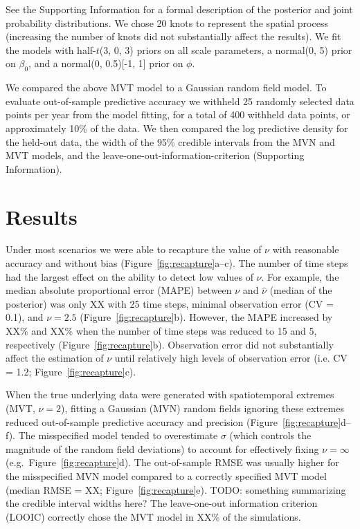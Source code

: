 \documentclass[12pt,english]{article}
\begin{document}
\begin{spacing}{1.9}
See the Supporting Information for a formal description
of the posterior and joint
probability distributions.
We chose 20 knots to represent the spatial process
(increasing the number of knots did not substantially affect the results).
We fit the models with half-$t$(3, 0, 3) priors on all
scale parameters,
a normal(0, 5) prior on $\beta_0$,
and a normal(0, 0.5)[-1, 1] prior on $\phi$.

We compared the above MVT
model to a Gaussian random field model.
To evaluate out-of-sample predictive accuracy we withheld
25 randomly selected data points
per year from the model fitting,
for a total of 400 withheld data points,
or approximately 10\% of the data.
We then compared the log predictive density for the held-out data,
the width of the 95\% credible intervals
from the MVN and MVT models, and
the leave-one-out-information-criterion (Supporting Information).

\section{Results}

Under most scenarios we were able to recapture the value of $\nu$ with
reasonable accuracy and without bias (Figure~\ref{fig:recapture}a--c). The
number of time steps had the largest effect on the ability to detect low values
of $\nu$. For example, the median absolute proportional error (MAPE) between
$\nu$ and $\hat{\nu}$ (median of the posterior) was only XX with 25 time steps,
minimal observation error (CV = 0.1), and $\nu = 2.5$
(Figure~\ref{fig:recapture}b). However, the MAPE increased by XX\% and XX\% when
the number of time steps was reduced to 15 and 5, respectively
(Figure~\ref{fig:recapture}b). Observation error did not substantially affect
the estimation of $\nu$ until relatively high levels of observation error
(i.e. CV = 1.2; Figure~\ref{fig:recapture}c).

When the true underlying data were generated with spatiotemporal extremes (MVT,
$\nu = 2$), fitting a Gaussian (MVN) random fields ignoring these extremes
reduced out-of-sample predictive accuracy and precision
(Figure~\ref{fig:recapture}d--f). The misspecified model tended to overestimate
$\sigma$ (which controls the magnitude of the random field deviations) to
account for effectively fixing $\nu = \infty$ (e.g.\ Figure~\ref{fig:recapture}d). The
out-of-sample RMSE was usually higher for the misspecified MVN model compared to
a correctly specified MVT model (median RMSE = XX; Figure~\ref{fig:recapture}e).
TODO: something summarizing the credible interval widths here? The leave-one-out
information criterion (LOOIC) correctly chose the MVT model in XX\% of the
simulations.


\end{spacing}
\end{document}
